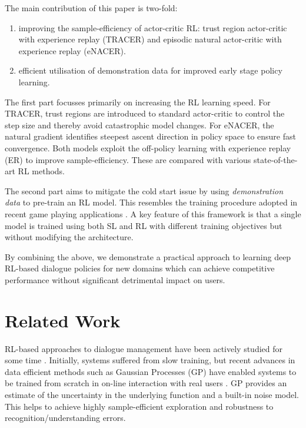\documentclass[11pt,a4paper]{article}
\begin{document}
The main contribution of this paper is two-fold:
\begin{enumerate}
\item improving the sample-efficiency of 
actor-critic RL:
trust region actor-critic with experience replay (TRACER) and episodic natural actor-critic with experience replay (eNACER).
\item efficient utilisation of demonstration data for improved early stage policy learning.
\end{enumerate}

The first part focusses primarily on increasing the RL learning speed. 
For TRACER, trust regions are introduced to standard actor-critic to control the step size and thereby avoid catastrophic model changes. For eNACER, the natural gradient identifies steepest ascent direction in policy space to ensure fast convergence. Both models exploit the off-policy learning with experience replay (ER) to improve sample-efficiency. These are compared with various state-of-the-art RL methods.

The second part aims to mitigate the cold start issue by using  
{\it demonstration data} to pre-train an RL model.
This resembles the training procedure adopted in recent game playing applications \cite{silver2016mastering,SLRL_atari}. A key feature of this framework is that a single model is trained using both SL and RL with different training objectives but without modifying the architecture.

By combining the above, we demonstrate a practical approach to learning deep RL-based dialogue policies for new domains which can achieve competitive performance without significant detrimental impact on users.

\section{Related Work} \label{sec:relate} 
RL-based approaches to dialogue management have been actively studied for some time \cite{levin1998using,lemon2006evaluating,GPRL}. Initially, systems suffered from slow training, but recent advances in data efficient methods such as Gaussian Processes (GP) have enabled systems to be trained from scratch in on-line interaction with real users \cite{milica_real_users}.
GP provides an  estimate of the uncertainty in the underlying function and a built-in noise model. This helps to achieve highly sample-efficient exploration and robustness to recognition/understanding errors. 
\end{document}

